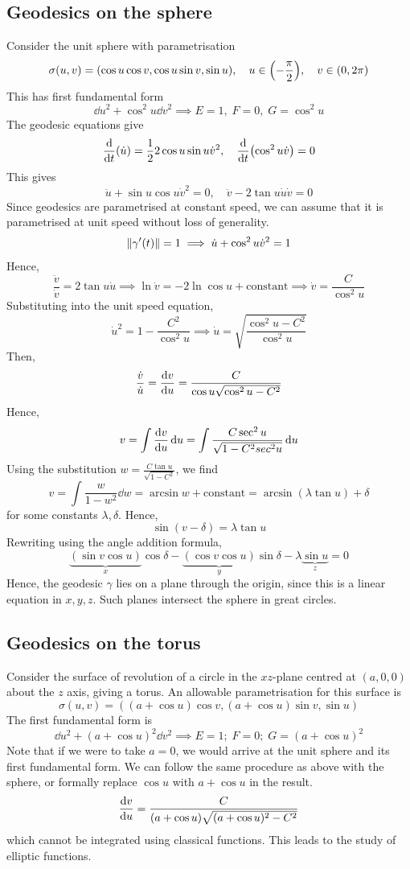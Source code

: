 \documentclass[a4paper]{article}
\begin{document}
\subsection{Geodesics on the sphere}
Consider the unit sphere with parametrisation
\[
	\sigma(u,v) = (\cos u \cos v, \cos u \sin v, \sin u),\quad u \in \qty(-\frac{\pi}{2}),\quad v \in \qty(0, 2 \pi)
\]
This has first fundamental form
\[
	\dd{u}^2 + \cos^2 u \dd{v}^2 \implies E = 1,\; F = 0,\; G = \cos^2 u
\]
The geodesic equations give
\[
	\dv{t} \qty(\dot u) = \frac{1}{2} 2\cos u \sin u \dot v^2,\quad \dv{t} \qty(\cos^2 u \dot v) = 0
\]
This gives
\[
	\ddot u + \sin u \cos u \dot v^2 = 0,\quad \ddot v - 2 \tan u \dot u \dot v = 0
\]
Since geodesics are parametrised at constant speed, we can assume that it is parametrised at unit speed without loss of generality.
\[
	\norm{\gamma'(t)} = 1 \implies \dot u + \cos^2 u \dot v^2 = 1
\]
Hence,
\[
	\frac{\ddot v}{\dot v} = 2 \tan u \dot u \implies \ln \dot v = -2 \ln \cos u + \text{constant} \implies \dot v = \frac{C}{\cos^2 u}
\]
Substituting into the unit speed equation,
\[
	\dot u^2 = 1 - \frac{C^2}{\cos^2 u} \implies \dot u = \sqrt{\frac{\cos^2 u - C^2}{\cos^2 u}}
\]
Then,
\[
	\frac{\dot v}{\dot u} = \dv{v}{u} = \frac{C}{\cos u \sqrt{\cos^2 u - C^2}}
\]
Hence,
\[
	v = \int \dv{v}{u} \dd{u} = \int \frac{C \sec^2 u}{\sqrt{1-C^2 sec^2 u}} \dd{u}
\]
Using the substitution \( w = \frac{C \tan u}{\sqrt{1-C^2}} \), we find
\[
	v = \int \frac{w}{1-w^2} \dd{w} = \arcsin w + \text{constant} = \arcsin(\lambda \tan u) + \delta
\]
for some constants \( \lambda, \delta \).
Hence,
\[
	\sin (v - \delta) = \lambda \tan u
\]
Rewriting using the angle addition formula,
\[
	\underbrace{(\sin v \cos u)}_{x}\cos \delta - \underbrace{(\cos v \cos u)}_{y}\sin \delta - \lambda \underbrace{\sin u}_z = 0
\]
Hence, the geodesic \( \gamma \) lies on a plane through the origin, since this is a linear equation in \( x, y, z \).
Such planes intersect the sphere in great circles.

\subsection{Geodesics on the torus}
Consider the surface of revolution of a circle in the \( xz \)-plane centred at \( (a,0,0) \) about the \( z \) axis, giving a torus.
An allowable parametrisation for this surface is
\[
	\sigma(u,v) = ((a+\cos u)\cos v, (a+\cos u)\sin v, \sin u)
\]
The first fundamental form is
\[
	\dd{u}^2 + (a+\cos u)^2 \dd{v}^2 \implies E = 1;\;F = 0;\;G = (a+\cos u)^2
\]
Note that if we were to take \( a = 0 \), we would arrive at the unit sphere and its first fundamental form.
We can follow the same procedure as above with the sphere, or formally replace \( \cos u \) with \( a+\cos u \) in the result.
\[
	\dv{v}{u} = \frac{C}{(a+\cos u)\sqrt{(a+\cos u)^2 - C^2}}
\]
which cannot be integrated using classical functions.
This leads to the study of elliptic functions.
\end{document}
